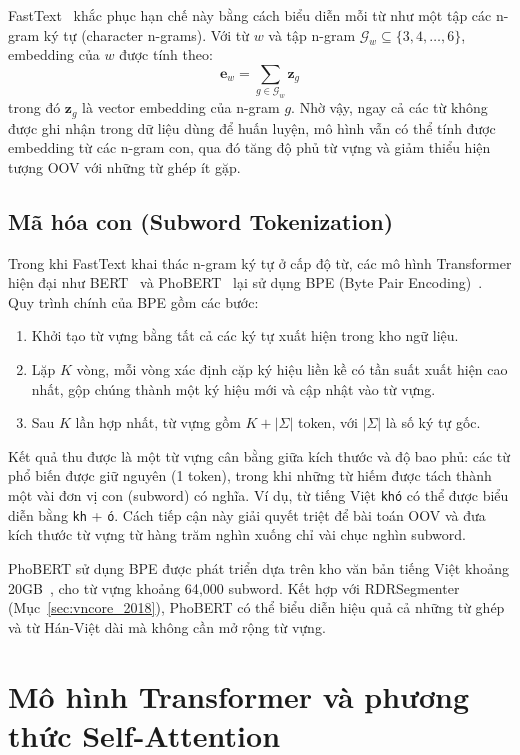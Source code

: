 FastText~\cite{bojanowski2017fasttext} khắc phục hạn chế này bằng cách biểu diễn mỗi từ như một tập các n-gram ký tự (character n-grams). Với từ $w$ và tập n-gram $\mathcal{G}_w \subseteq \{3, 4, \dots, 6\}$, embedding của $w$ được tính theo:
\[
  \mathbf{e}_w = \sum_{g \in \mathcal{G}_w} \mathbf{z}_g
\]
trong đó $\mathbf{z}_g$ là vector embedding của n-gram $g$. Nhờ vậy, ngay cả các từ không được ghi nhận trong dữ liệu dùng để huấn luyện, mô hình vẫn có thể tính được embedding từ các n-gram con, qua đó tăng độ phủ từ vựng và giảm thiểu hiện tượng OOV với những từ ghép ít gặp.

\subsection{Mã hóa con (Subword Tokenization)}

Trong khi FastText khai thác n-gram ký tự ở cấp độ từ, các mô hình Transformer hiện đại như BERT~\cite{devlin2019bert} và PhoBERT~\cite{phobert2020} lại sử dụng BPE (Byte Pair Encoding)~\cite{sennrich2016bpe}. Quy trình chính của BPE gồm các bước:

\begin{enumerate}[leftmargin=2.5em]
  \item Khởi tạo từ vựng bằng tất cả các ký tự xuất hiện trong kho ngữ liệu.
  \item Lặp $K$ vòng, mỗi vòng xác định cặp ký hiệu liền kề có tần suất xuất hiện cao nhất, gộp chúng thành một ký hiệu mới và cập nhật vào từ vựng.
  \item Sau $K$ lần hợp nhất, từ vựng gồm $K + |\Sigma|$ token, với $|\Sigma|$ là số ký tự gốc.
\end{enumerate}

Kết quả thu được là một từ vựng cân bằng giữa kích thước và độ bao phủ: các từ phổ biến được giữ nguyên (1 token), trong khi những từ hiếm được tách thành một vài đơn vị con (subword) có nghĩa. Ví dụ, từ tiếng Việt \texttt{khó} có thể được biểu diễn bằng \texttt{kh} + \texttt{ó}. Cách tiếp cận này giải quyết triệt để bài toán OOV và đưa kích thước từ vựng từ hàng trăm nghìn xuống chỉ vài chục nghìn subword.

PhoBERT sử dụng BPE được phát triển dựa trên kho văn bản tiếng Việt khoảng 20GB~\cite{phobert2020}, cho từ vựng khoảng 64{,}000 subword. Kết hợp với RDRSegmenter (Mục~\ref{sec:vncore_2018}), PhoBERT có thể biểu diễn hiệu quả cả những từ ghép và từ Hán-Việt dài mà không cần mở rộng từ vựng.

\section{Mô hình Transformer và phương thức Self-Attention}
\label{sec:transformer}

